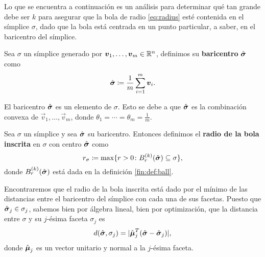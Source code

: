 Lo que se encuentra a continuación es un análisis para determinar qué tan grande debe ser $k$ para
asegurar que la bola de radio \eqref{eq:radius} esté contenida en el símplice $\sigma$, dado que la
bola está centrada en un punto particular, a saber, en el baricentro del símplice.

\begin{definition}
	Sea $\sigma$ un símplice generado por $\boldsymbol{v}_1, \ldots, \boldsymbol{v}_m \in \mathbb{R}^n$, definimos su
	\textbf{baricentro} $\hat{\boldsymbol{ \sigma }}$ como
	\begin{equation*}
		\hat{\boldsymbol{ \sigma }} \coloneq \frac{1}{m} \sum_{i=1}^{m}\boldsymbol{v}_i.
	\end{equation*}
\end{definition}
\begin{observation}
	El baricentro $\hat{\boldsymbol{ \sigma }}$ es un elemento de $\sigma$. Esto se debe a que $\hat{\boldsymbol{ \sigma }}$ es la
	combinación convexa de $\vec{v}_1, \ldots, \vec{v}_m$, donde $\theta_1 = \cdots = \theta_m =
	\frac{1}{m}$.
\end{observation}

\begin{definition}
	\label{def:r-sigma}
	Sea $\sigma$ un símplice y sea $\hat{\boldsymbol{ \sigma }}$ su baricentro. Entonces definimos el \textbf{radio
	de la bola inscrita} en $\sigma$ con centro $\hat{\boldsymbol{ \sigma }}$ como
	\begin{equation}
		\label{eq:def:r-sigma}
		r_\sigma \coloneq \max \lbrace r > 0 \colon B_r^{(k)}(\hat{\boldsymbol{ \sigma }})
		\subseteq \sigma \rbrace,
	\end{equation}
	donde $B_r^{(k)}(\hat{\boldsymbol{ \sigma }})$ está dada en la definición \ref{fin:def:ball}.
\end{definition}

Encontraremos que el radio de la bola inscrita está dado por el mínimo de las distancias
entre el baricentro del símplice con cada una de sus facetas. Puesto que $\hat{\boldsymbol{ \sigma }}_j \in
\sigma_j$, sabemos bien por álgebra lineal, bien por optimización, que la distancia entre $\sigma$ y
su $j$-ésima faceta $\sigma_j$ es
\begin{equation}
	\label{eq:dist:v1}
	d(\hat{\boldsymbol{ \sigma }}, \sigma_j) = |\hat{\boldsymbol{\mu}}_j^T(\hat{\boldsymbol{ \sigma }} - \hat{\boldsymbol{ \sigma }}_j)|,
\end{equation}
donde $\hat{\boldsymbol{\mu}}_j$ es un vector unitario y normal a la $j$-ésima faceta.

